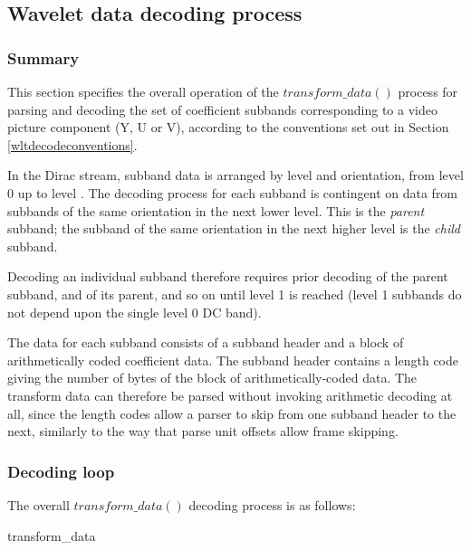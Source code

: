 \subsection{Wavelet data decoding process}

\subsubsection{Summary}

\label{transformdata}

This section specifies the overall operation of the $transform\_data()$ process
for parsing and decoding the set of coefficient subbands corresponding
to a video picture component (Y, U or V), according to the conventions set out
in Section \ref{wltdecodeconventions}.

In the Dirac stream, subband data is arranged by level and orientation, from
level 0 up to level \TransformDepth. The decoding process for each subband is
contingent on data from subbands of the same orientation in the next lower level.
This is the {\em parent} subband; the subband of the same orientation in the next
higher level is the {\em child} subband. 

Decoding an individual subband therefore requires prior decoding of the parent subband,
and of its parent, and so on until level 1 is reached (level 1 subbands do not depend
upon the single level 0 DC band).

\begin{informative}
The data for each subband consists of a subband header and a block of arithmetically
coded coefficient data. The subband header contains a length code giving the number of
bytes of the block of arithmetically-coded data. The transform data can therefore be
parsed without invoking arithmetic decoding at all, since the length codes allow a 
parser to skip from one subband header to the next, similarly to the way that parse unit
offsets allow frame skipping.
\end{informative}

\subsubsection{Decoding loop}

The overall $transform\_data()$ decoding process is as follows:

\begin{pseudo}{transform\_data}{}
  \bsEND
\bsEND
{}
\end{pseudo}


